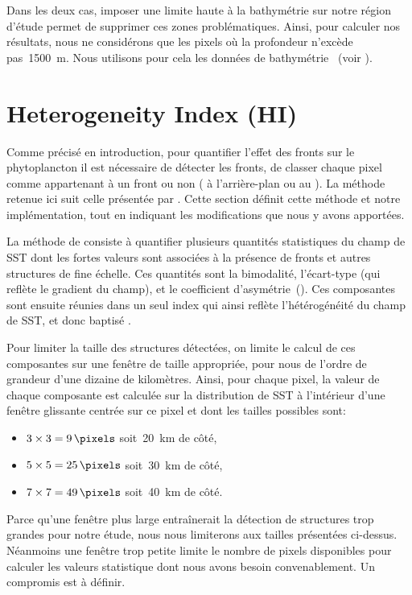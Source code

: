 Dans les deux cas, imposer une limite haute à la bathymétrie sur notre région d'étude permet de supprimer ces zones problématiques.
Ainsi, pour calculer nos résultats, nous ne considérons que les pixels où la profondeur n'excède pas~\qty{1500}{\m}.
Nous utilisons pour cela les données de bathymétrie ~(voir ).

\section{Heterogeneity Index (HI)}
\label{sec:HI}

Comme précisé en introduction, pour quantifier l'effet des fronts sur le phytoplancton il est nécessaire de détecter les fronts,  de classer chaque pixel comme appartenant à un front ou non ( à l'arrière-plan ou au ).
La méthode retenue ici suit celle présentée par \textcite{liu_2016} .
Cette section définit cette méthode et notre implémentation, tout en indiquant les modifications que nous y avons apportées.

La méthode de \textcite{liu_2016} consiste à quantifier plusieurs quantités statistiques du champ de SST dont les fortes valeurs sont associées à la présence de fronts et autres structures de fine échelle.
Ces quantités sont la bimodalité, l'écart-type (qui reflète le gradient du champ), et le coefficient d'asymétrie~().
Ces composantes sont ensuite réunies dans un seul index qui ainsi reflète l'hétérogénéité du champ de SST, et donc baptisé .

Pour limiter la taille des structures détectées, on limite le calcul de ces composantes sur une fenêtre de taille appropriée,  pour nous de l'ordre de grandeur d'une dizaine de kilomètres.
Ainsi, pour chaque pixel, la valeur de chaque composante est calculée sur la distribution de SST à l'intérieur d'une fenêtre glissante centrée sur ce pixel et dont les tailles possibles sont:
\begin{itemize}
  \item \(3 \times 3 =\qty{9}{\pixels}\) soit~\tapprox\qty{20}{\km} de côté,
  \item \(5 \times 5 =\qty{25}{\pixels}\) soit~\tapprox\qty{30}{\km} de côté,
  \item \(7 \times 7 =\qty{49}{\pixels}\) soit~\tapprox\qty{40}{\km} de côté.
\end{itemize}
Parce qu'une fenêtre plus large entraînerait la détection de structures trop grandes pour notre étude, nous nous limiterons aux tailles présentées ci-dessus.
Néanmoins une fenêtre trop petite limite le nombre de pixels disponibles pour calculer les valeurs statistique dont nous avons besoin convenablement.
Un compromis est à définir.

